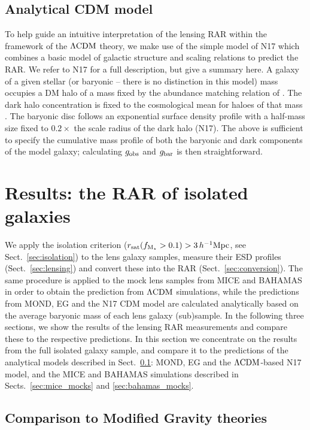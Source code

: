\documentclass[usenatbib]{mnras}
\newcommand{\hMpc}{\, h^{-1}{\rm{Mpc}} }
\newcommand{\lcdm}{{\rm \Lambda CDM}}
\newcommand{\un}[1]{_{\rm #1}}
\begin{document}
\subsection{Analytical CDM model}
\label{sec:analytical}

To help guide an intuitive interpretation of the lensing RAR within the framework of the $\lcdm$ theory, we make use of the simple model of N17 which combines a basic model of galactic structure and scaling relations to predict the RAR. We refer to N17 for a full description, but give a summary here. A galaxy of a given stellar (or baryonic -- there is no distinction in this model) mass occupies a DM halo of a mass fixed by the abundance matching relation of \citet{behroozi2013}. The dark halo concentration is fixed to the cosmological mean for haloes of that mass \citep{ludlow2014}. The baryonic disc follows an exponential surface density profile with a half-mass size fixed to $0.2\times$ the scale radius of the dark halo (N17). The above is sufficient to specify the cumulative mass profile of both the baryonic and dark components of the model galaxy; calculating $g\un{obs}$ and $g\un{bar}$ is then straightforward.


\section{Results: the RAR of isolated galaxies}
\label{sec:results}

We apply the isolation criterion ($r\un{sat}(f\un{M_\star}>0.1)>3\hMpc$, see Sect.~\ref{sec:isolation}) to the lens galaxy samples, measure their ESD profiles (Sect.~\ref{sec:lensing}) and convert these into the RAR (Sect.~\ref{sec:conversion}). The same procedure is applied to the mock lens samples from MICE and BAHAMAS in order to obtain the prediction from $\lcdm$ simulations, while the predictions from MOND, EG and the N17 CDM model are calculated analytically based on the average baryonic mass of each lens galaxy (sub)sample. In the following three sections, we show the results of the lensing RAR measurements and compare these to the respective predictions. In this section we concentrate on the results from the full isolated galaxy sample, and compare it to the predictions of the analytical models described in Sect.~\ref{sec:analytical}: MOND, EG and the $\lcdm$-based N17 model, and the MICE and BAHAMAS simulations described in Sects.~\ref{sec:mice_mocks} and \ref{sec:bahamas_mocks}.


\subsection{Comparison to Modified Gravity theories}
\label{sec:results-analytical}
\end{document}
